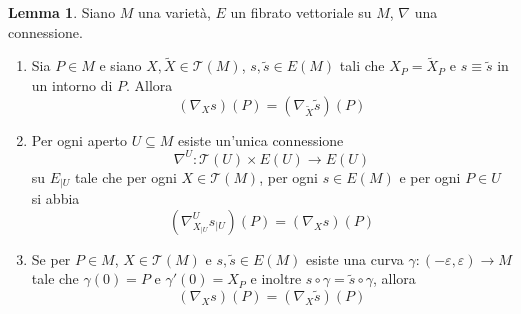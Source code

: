 \documentclass[a4paper,11pt]{article}
\theoremstyle{definition}
\theoremstyle{theorem}
\newtheorem{lemma}[teorema]{Lemma}
\newcommand{\T}{\mathcal{T}}
\begin{document}
\begin{lemma}
	Siano $M$ una varietà, $E$ un fibrato vettoriale su $M$, $\nabla$ una connessione.
	\begin{enumerate}
		\item Sia $P\in M$ e siano $X,\tilde{X}\in\T(M)$, $s,\tilde{s}\in E(M)$ tali che $X_P=\tilde{X}_P$ e $s\equiv\tilde{s}$ in un intorno di $P$. Allora 
		\[\left(\nabla_Xs\right)(P)=\left(\nabla_{\tilde{X}}\tilde{s}\right)(P)\]
		\item Per ogni aperto $U\subseteq M$ esiste un'unica connessione
		\[\nabla^U\colon\T(U)\times E(U)\to E(U)\]
		su $E_{|U}$ tale che per ogni $X\in\T(M)$, per ogni $s\in E(M)$ e per ogni $P\in U$ si abbia
		\[\left(\nabla^U_{X_{|U}}s_{|U}\right)(P)=\left(\nabla_Xs\right)(P)\]
		\item Se per $P\in M$, $X\in\T(M)$ e $s,\tilde{s}\in E(M)$ esiste una curva $\gamma\colon(-\varepsilon,\varepsilon)\to M$ tale che $\gamma(0)=P$ e $\gamma'(0)=X_P$ e inoltre $s\circ\gamma=\tilde{s}\circ\gamma$, allora
		\[\left(\nabla_Xs\right)(P)=\left(\nabla_X\tilde{s}\right)(P)\]
	\end{enumerate}
\end{lemma}
\end{document}
